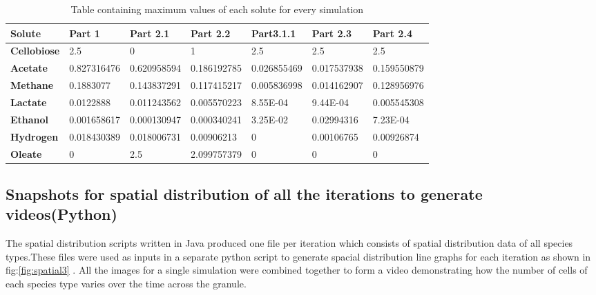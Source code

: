 \begin{table}[]
\centering
\caption{Table containing maximum values of each solute for every simulation}
\label{maxsolutes}
\begin{tabular}{|l|l|l|l|l|l|l|}
\hline
\textbf{Solute}     & \textbf{Part 1} & \textbf{Part 2.1} & \textbf{Part 2.2} & \textbf{Part3.1.1} & \textbf{Part 2.3} & \textbf{Part 2.4} \\ \hline
\textbf{Cellobiose} & 2.5             & 0                 & 1                 & 2.5                & 2.5               & 2.5               \\ \hline
\textbf{Acetate}    & 0.827316476     & 0.620958594       & 0.186192785       & 0.026855469        & 0.017537938       & 0.159550879       \\ \hline
\textbf{Methane}    & 0.1883077       & 0.143837291       & 0.117415217       & 0.005836998        & 0.014162907       & 0.128956976       \\ \hline
\textbf{Lactate}    & 0.0122888       & 0.011243562       & 0.005570223       & 8.55E-04           & 9.44E-04          & 0.005545308       \\ \hline
\textbf{Ethanol}    & 0.001658617     & 0.000130947       & 0.000340241       & 3.25E-02           & 0.02994316        & 7.23E-04          \\ \hline
\textbf{Hydrogen}   & 0.018430389     & 0.018006731       & 0.00906213        & 0                  & 0.00106765        & 0.00926874        \\ \hline
\textbf{Oleate}     & 0               & 2.5               & 2.099757379       & 0                  & 0                 & 0                 \\ \hline
\end{tabular}
\end{table}


\subsection{Snapshots for spatial distribution of all the iterations to generate videos(Python)}

The spatial distribution scripts written in Java produced one file per iteration which consists of spatial distribution data of all species types.These files were used as inputs in a separate python script to generate spacial distribution line graphs for each iteration as shown in fig:\ref{fig:spatial3} . All the images for a single simulation were combined together to form a video demonstrating how the number of cells of each species type varies over the time across the granule.


